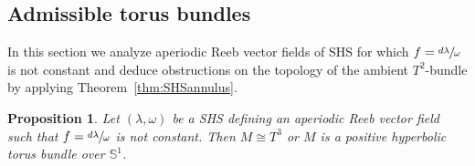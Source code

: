 \documentclass[11pt]{article}
\newtheorem{prop}[theorem]{Proposition}
\theoremstyle{definition}
\newcommand{\mS}{\mathbb{S}}
\begin{document}
\subsection{Admissible torus bundles}

In this section we analyze aperiodic Reeb vector fields of SHS for which $f=\sfrac{d\lambda}{\omega}$ is not constant and deduce obstructions on the topology of the ambient $T^2$-bundle by applying Theorem~\ref{thm:SHSannulus}.

\begin{prop}\label{prop:bundles}
Let $(\lambda, \omega)$ be a SHS defining an aperiodic Reeb vector field such that $f=\sfrac{d\lambda}{\omega}$ is not constant. Then $M\cong T^3$ or $M$ is a positive hyperbolic torus bundle over $\mS^1$.
\end{prop}
\end{document}

